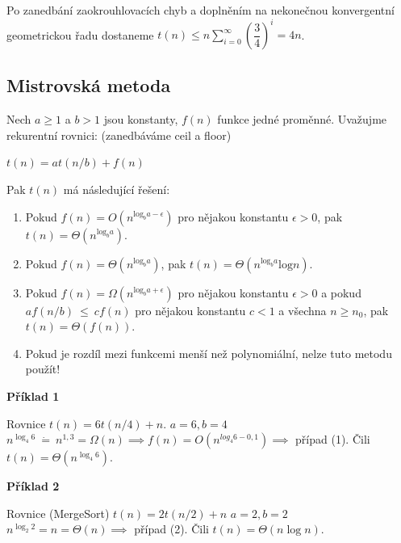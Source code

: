 \documentclass{szzclass}
\begin{document}
Po zanedbání zaokrouhlovacích chyb a doplněním na nekonečnou
konvergentní geometrickou řadu dostaneme
$t(n) \leq n \sum\limits_{i=0}^{\infty}(\dfrac{3}{4})^i= 4n$.






\subsection{Mistrovská metoda}

Nech $a \geq 1$ a $b > 1$ jsou konstanty, $f(n)$ funkce jedné proměnné.
Uvažujme rekurentní rovnici: (zanedbáváme ceil a floor)
\begin{center}
    $t(n) = at(n/b) + f(n)$ 
\end{center}

Pak $t(n)$ má následující řešení:
\begin{enumerate}
    \item Pokud $f(n) = O(n^{\text{log}_b a - \epsilon} )$ pro nějakou konstantu $\epsilon > 0$, pak $t(n) = \Theta (n^{\text{log}_b a})$.
    \item Pokud $f(n) = \Theta (n^{\text{log}_b a})$, pak $t(n) = \Theta (n^{\text{log}_b a} \text{log} n)$.
    \item Pokud $f(n) = \Omega (n^{\text{log}_b a + \epsilon} )$ pro nějakou konstantu $\epsilon > 0$ a pokud
    $af(n/b)~\leq~cf(n)$ pro nějakou konstantu $c < 1$ a všechna $n \geq n_0$, pak $t(n) = \Theta (f(n))$.
    \item Pokud je rozdíl mezi funkcemi menší než polynomiální, nelze tuto metodu použít!
\end{enumerate}

\textbf{Příklad 1}

Rovnice $t(n) = 6t(n/4) + n$.\newline
$a = 6, b = 4$\newline
$n^{\log_4 6}~\dot{=}~n^{1,3} = \Omega(n) \implies f(n) = O(n^{log_4 6-0,1}) \implies$ případ (1).\newline
Čili $t(n) = \Theta(n^{\log_4 6})$.

\textbf{Příklad 2}

Rovnice (MergeSort) $t(n) = 2t(n/2) + n$\newline
$a = 2, b = 2$\newline
$n^{\log_2 2} = n = \Theta(n) \implies$ případ (2).\newline
Čili $t(n) = \Theta(n \log n)$.
\end{document}
